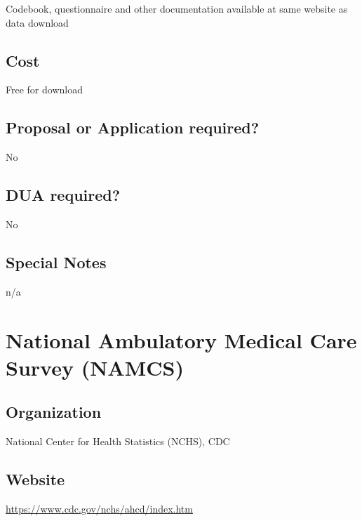 \documentclass[
]{book}
\begin{document}
Codebook, questionnaire and other documentation available at same website as data download

\hypertarget{cost-42}{%
\section{Cost}\label{cost-42}}

Free for download

\hypertarget{proposal-or-application-required-42}{%
\section{Proposal or Application required?}\label{proposal-or-application-required-42}}

No

\hypertarget{dua-required-42}{%
\section{DUA required?}\label{dua-required-42}}

No

\hypertarget{special-notes-42}{%
\section{Special Notes}\label{special-notes-42}}

n/a

\mainmatter

\hypertarget{national-ambulatory-medical-care-survey-namcs}{%
\chapter{National Ambulatory Medical Care Survey (NAMCS)}\label{national-ambulatory-medical-care-survey-namcs}}

\hypertarget{organization-43}{%
\section{Organization}\label{organization-43}}

National Center for Health Statistics (NCHS), CDC

\hypertarget{website-43}{%
\section{Website}\label{website-43}}

\url{https://www.cdc.gov/nchs/ahcd/index.htm}
\end{document}
